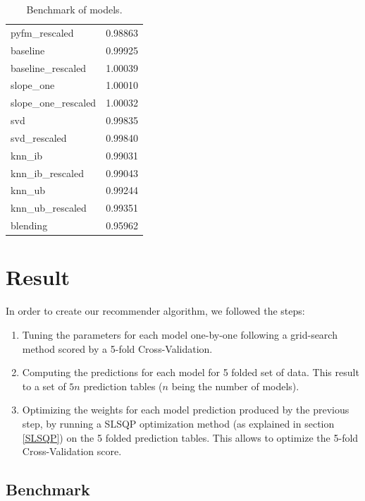 \documentclass[10pt,conference,compsocconf]{IEEEtran}
\begin{document}
\begin{table}[htbp]
\begin{tabular}[c]{| l r |}
pyfm\_rescaled                           			& 0.98863 \\
baseline                                 				& 0.99925 \\
baseline\_rescaled                       			& 1.00039\\
slope\_one                               				& 1.00010\\
slope\_one\_rescaled                     			& 1.00032\\
svd                                      				& 0.99835\\
svd\_rescaled                            				& 0.99840 \\
knn\_ib                                  				& 0.99031 \\
knn\_ib\_rescaled                        			& 0.99043\\
knn\_ub                                  				& 0.99244 \\
knn\_ub\_rescaled                        			& 0.99351 \\
 \hline \hline
blending			&  0.95962 \\ 
\hline
\end{tabular}
  \caption{Benchmark of models.}
  \label{benchmark}
\end{table}


\section{Result}

In order to create our recommender algorithm, we followed the steps: 
\begin{enumerate}
\item Tuning the parameters for each model one-by-one following a grid-search method scored by a 5-fold Cross-Validation. 

\item Computing the predictions for each model for 5 folded set of data. This result to a set of $5n$ prediction tables ($n$ being the number of models).

\item Optimizing the weights for each model prediction produced by the previous step, by running a SLSQP optimization method (as explained in section \ref{SLSQP}) on the 5 folded prediction tables. This allows to optimize the 5-fold Cross-Validation score.
\end{enumerate}


\subsection{Benchmark}
\label{sec:model_bench}
\end{document}
